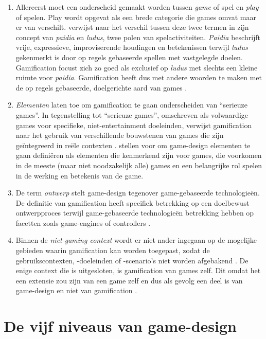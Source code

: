 \begin{enumerate}[label=(\arabic*)]
    \item Allereerst moet een onderscheid gemaakt worden tussen \textit{game} of spel en \textit{play} of spelen. Play wordt opgevat als een brede categorie die games omvat maar er van verschilt. \textcite{Caillois2001} verwijst naar het verschil tussen deze twee termen in zijn concept van \textit{paidia} en \textit{ludus}, twee polen van spelactiviteiten. \textit{Paidia} beschrijft vrije, expressieve, improviserende houdingen en betekenissen terwijl \textit{ludus} gekenmerkt is door op regels gebaseerde spellen met vastgelegde doelen. Gamification focust zich zo goed als exclusief op \textit{ludus} met slechts een kleine ruimte voor \textit{paidia}. Gamification heeft dus met andere woorden te maken met de op regels gebaseerde, doelgerichte aard van games \autocite{Sailer2016}.
    \item \textit{Elementen} laten toe om gamification te gaan onderscheiden van ``serieuze games''. In tegenstelling tot ``serieuze games'', omschreven als volwaardige games voor specifieke, niet-entertainment doeleinden, verwijst gamification naar het gebruik van verschillende bouwstenen van games die zijn geïntegreerd in reële contexten \autocite{Groh2012}. \textcite{Deterding20112} stellen voor om game-design elementen te gaan definiëren als elementen die kenmerkend zijn voor games, die voorkomen in de meeste (maar niet noodzakelijk alle) games en een belangrijke rol spelen in de werking en betekenis van de game.
    \item De term \textit{ontwerp} stelt game-design tegenover game-gebaseerde technologieën. De definitie van gamification heeft specifiek betrekking op een doelbewust ontwerpproces terwijl game-gebaseerde technologieën betrekking hebben op facetten zoals game-engines of controllers \autocite{Sailer2016}.
    \item Binnen de \textit{niet-gaming context} wordt er niet nader ingegaan op de mogelijke gebieden waarin gamification kan worden toegepast, zodat de gebruikscontexten, -doeleinden of -scenario's niet worden afgebakend \autocite{Sailer2016}. De enige context die is uitgesloten, is gamification van games zelf. Dit omdat het een extensie zou zijn van een game zelf en dus als gevolg een deel is van game-design en niet van gamification \autocite{Groh2012}.
\end{enumerate}

\section{De vijf niveaus van game-design}

